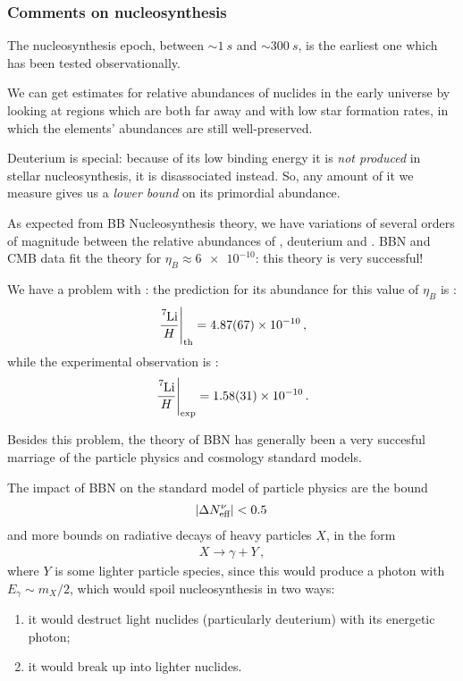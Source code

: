 \documentclass[main.tex]{subfiles}
\begin{document}
\subsubsection{Comments on nucleosynthesis}

The nucleosynthesis epoch, between \(\sim \SI{1}{s}\) and \(\sim \SI{300}{s}\), is the earliest one which has been tested observationally. 

We can get estimates for relative abundances of nuclides in the early universe by looking at regions which are both far away and with low star formation rates, in which the elements' abundances are still well-preserved. 

Deuterium is special: because of its low binding energy it is \emph{not produced} in stellar nucleosynthesis, it is disassociated instead.
So, any amount of it we measure gives us a \emph{lower bound} on its primordial abundance. 

As expected from BB Nucleosynthesis theory, we have variations of several orders of magnitude between the relative abundances of , deuterium and . 
BBN and CMB data fit the theory for \(\eta_{B} \approx \num{6e-10}\): this theory is very successful!

We have a problem with : the prediction for its abundance for this value of \(\eta_{B}\) is \cite[]{cyburtBigBangNucleosynthesis2016}:
%
\begin{align}
\eval{\frac{\ce{^{7}Li}}{H}}_{\text{th}} = \num{4.87(67)e-10}
\,,
\end{align}
%
while the experimental observation is \cite[]{cocPrimordialNucleosynthesis2017}: 
%
\begin{align}
\eval{\frac{\ce{^{7}Li}}{H}}_{\text{exp}} = \num{1.58(31)e-10}
\,.
\end{align}

Besides this problem, the theory of BBN has generally been a very succesful marriage of the particle physics and cosmology standard models. 

The impact of BBN on the standard model of particle physics are the bound 
%
\begin{align}
\abs{\Delta N _{\text{eff}}^{\nu }} < \num{.5}
\,
\end{align}
%
and more bounds on radiative decays of heavy particles \(X\), in the form 
%
\begin{align}
X \to \gamma + Y
\,,
\end{align}
%
where \(Y\) is some lighter particle species, since this would produce a photon with \(E_{\gamma } \sim m_X /2\), which would spoil nucleosynthesis in two ways: 
\begin{enumerate}
    \item it would destruct light nuclides (particularly deuterium) with its energetic photon;
    \item it would break up  into lighter nuclides.
\end{enumerate}
\end{document}
